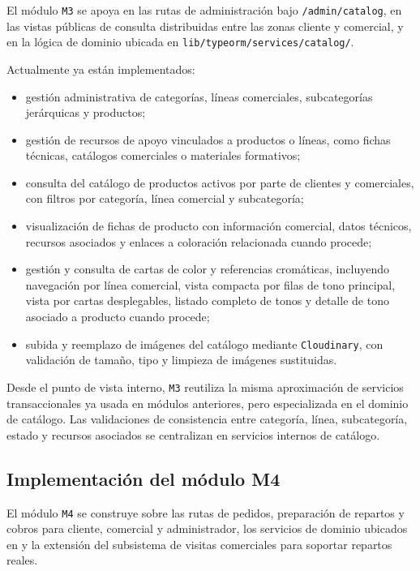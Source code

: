 El módulo \texttt{M3} se apoya en las rutas de administración bajo \texttt{/admin/catalog}, en las vistas públicas de consulta distribuidas entre las zonas cliente y comercial, y en la lógica de dominio ubicada en \texttt{lib/typeorm/services/catalog/}.

Actualmente ya están implementados:

\begin{itemize}
    \item gestión administrativa de categorías, líneas comerciales, subcategorías jerárquicas y productos;
    \item gestión de recursos de apoyo vinculados a productos o líneas, como fichas técnicas, catálogos comerciales o materiales formativos;
    \item consulta del catálogo de productos activos por parte de clientes y comerciales, con filtros por categoría, línea comercial y subcategoría;
    \item visualización de fichas de producto con información comercial, datos técnicos, recursos asociados y enlaces a coloración relacionada cuando procede;
    \item gestión y consulta de cartas de color y referencias cromáticas, incluyendo navegación por línea comercial, vista compacta por filas de tono principal, vista por cartas desplegables, listado completo de tonos y detalle de tono asociado a producto cuando procede;
    \item subida y reemplazo de imágenes del catálogo mediante \texttt{Cloudinary}, con validación de tamaño, tipo y limpieza de imágenes sustituidas.
\end{itemize}

Desde el punto de vista interno, \texttt{M3} reutiliza la misma aproximación de servicios transaccionales ya usada en módulos anteriores, pero especializada en el dominio de catálogo. Las validaciones de consistencia entre categoría, línea, subcategoría, estado y recursos asociados se centralizan en servicios internos de catálogo.

\subsection{Implementación del módulo M4}

El módulo \texttt{M4} se construye sobre las rutas de pedidos, preparación de repartos y cobros para cliente, comercial y administrador, los servicios de dominio ubicados en  y la extensión del subsistema de visitas comerciales para soportar repartos reales.

